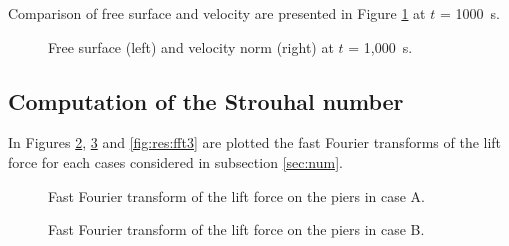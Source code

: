 Comparison of free surface and velocity are presented in Figure
\ref{fig:res:comparison} at $t$ = 1000~s.

\begin{figure}[H]
\begin{minipage}[t]{0.5\textwidth}
 \centering
\end{minipage}%
\begin{minipage}[t]{0.5\textwidth}
 \centering
\end{minipage}
\begin{minipage}[t]{0.5\textwidth}
 \centering
\end{minipage}%
\begin{minipage}[t]{0.5\textwidth}
 \centering
\end{minipage}
\begin{minipage}[t]{0.5\textwidth}
 \centering
\end{minipage}%
\begin{minipage}[t]{0.5\textwidth}
 \centering
\end{minipage}
 \caption{Free surface (left) and velocity norm (right) at $t$ = 1,000~s.}
 \label{fig:res:comparison}
\end{figure}


\subsection{Computation of the Strouhal number}

In Figures \ref{fig:res:fft1}, \ref{fig:res:fft2} and \ref{fig:res:fft3} are
plotted the fast Fourier transforms of the lift force for each cases considered
in subsection \ref{sec:num}.

\begin{figure}[H]
 \centering
 \caption{Fast Fourier transform of the lift force on the piers in case A.}
 \label{fig:res:fft1}
\end{figure}

\begin{figure}[H]
 \centering
 \caption{Fast Fourier transform of the lift force on the piers in case B.}
 \label{fig:res:fft2}
\end{figure}

